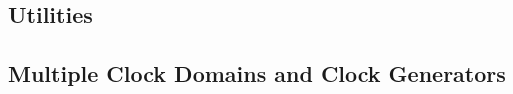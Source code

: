 \documentclass{article}
\begin{document}













\subsection{Utilities}







%











%























% 

% 

% 


\subsection{Multiple Clock Domains and Clock Generators}
\end{document}
